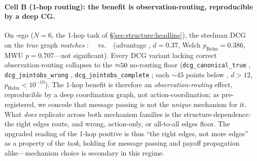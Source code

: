 \paragraph{Cell B (1-hop routing): the benefit is observation-routing,
reproducible by a deep CG.} On \pairrouting-ego ($N{=}6$, the 1-hop task of
\S\ref{sec:structure:headline}), the steelman DCG on the \emph{true} graph
\emph{matches} \gtrue: \CBBdcgtrue\ \CBBdcgtrueCI\ vs.\ \SCkTrue\ (advantage
\CBBgnnDcgGap, $d{=}0.37$, Welch $p_{\text{Holm}}{=}0.386$, MWU
$p{=}0.707$---not significant). Every DCG variant lacking correct
observation-routing collapses to the ${\approx}50$ no-routing floor
(\texttt{dcg\_canonical\_true} \CBBcanon, \texttt{dcg\_jointobs\_wrong}
\CBBwrong, \texttt{dcg\_jointobs\_complete} \CBBcomplete; each ${\sim}45$ points
below \gtrue, $d{>}12$, $p_{\text{Holm}}{<}10^{-10}$). The 1-hop benefit is
therefore an \emph{observation-routing} effect, reproducible by a deep
coordination graph, not action-coordination; as pre-registered, we concede that
message passing is not the \emph{unique} mechanism for it. What \emph{does}
replicate across both mechanism families is the structure-dependence: the right
edges route, and wrong, action-only, or all-to-all edges floor. The upgraded
reading of the 1-hop positive is thus ``the right edges, not more edges'' as a
property of the \emph{task}, holding for message passing and payoff propagation
alike---mechanism choice is secondary in this regime.

